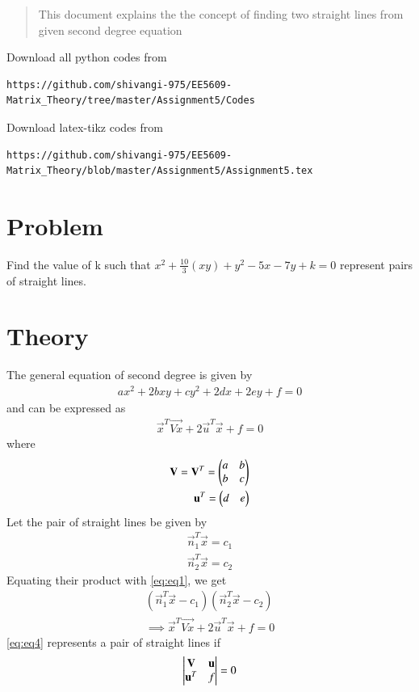 \documentclass[journal,12pt,twocolumn]{IEEEtran}
\begin{document}
%
\vspace{2ex}
\begin{center}
\end{center}
\begin{abstract}
This document explains the the concept of finding  two straight lines from given second degree equation 
\end{abstract}
Download all python codes from 
%
\begin{lstlisting}
https://github.com/shivangi-975/EE5609-Matrix_Theory/tree/master/Assignment5/Codes
\end{lstlisting}
%
Download latex-tikz codes from 
%
\begin{lstlisting}
https://github.com/shivangi-975/EE5609-Matrix_Theory/blob/master/Assignment5/Assignment5.tex
\end{lstlisting}
%
\section{Problem}
Find the value of k such that $x^2+\frac{10}{3}(xy)+y^2 -5x -7y + k =0$ represent pairs of straight lines.
\section{Theory}
The general equation of second degree is given by 
\begin{align} 
	ax^2 + 2bxy + cy^2 + 2dx + 2ey + f = 0 
\end{align}
and can be expressed as 
\begin{align}
	\vec{x}^T\vec{Vx} + 2\vec{u}^T\vec{x} + f = 0 \label{eq:eq1}
\end{align}
where 
\begin{align}
	\mathbf{V} = \mathbf{V}^T = \begin{pmatrix}a & b\\b & c\end{pmatrix} \label{eq:eq2} \\
	\mathbf{u}^T = \begin{pmatrix}d & e\end{pmatrix} \label{eq:eq3}
\end{align}
Let the pair of straight lines be given by 
\begin{align}
	\vec{n}_1^T\vec{x} = c_1\\
	\vec{n}_2^T\vec{x} = c_2
\end{align}
Equating their product with \eqref{eq:eq1}, we get
\begin{align}
	(\vec{n}_1^T\vec{x} - c_1)(\vec{n}_2^T\vec{x} - c_2) \nonumber \\
	\implies \vec{x}^T\vec{Vx} + 2\vec{u}^T\vec{x} + f = 0 \label{eq:eq4}
\end{align}
\eqref{eq:eq4} represents a pair of straight lines if
\begin{align} \label{eq:det1}
	\begin{vmatrix}\mathbf{V} & \mathbf{u} \\ \mathbf{u}^T & f\end{vmatrix} = 0
\end{align}
\end{document}
